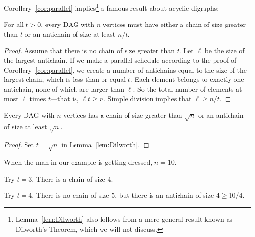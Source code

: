 Corollary~\ref{cor:parallel} implies\footnote{Lemma~\ref{lem:Dilworth}
  also follows from a more general result known as Dilworth's Theorem,
  which we will not discuss.} a famous result about acyclic digraphs:

\begin{lemma}[Dilworth]\label{lem:Dilworth}
For all $t>0$, every DAG with $n$ vertices must have either a chain of
size greater than $t$ or an antichain of size at least $n / t$.
\end{lemma}

\begin{proof}
Assume that there is no chain of size greater than $t$.  Let $\ell$ be
the size of the largest antichain.  If we make a parallel schedule
according to the proof of Corollary~\ref{cor:parallel}, we create a
number of antichains equal to the size of the largest chain, which is
less than or equal $t$.  Each element belongs to exactly one
antichain, none of which are larger than $\ell$.  So the total number
of elements at most $\ell$ times $t$---that is, $\ell t \geq n$.
Simple division implies that $\ell \geq n/t$.
\end{proof}

\begin{corollary}\label{cor:Dilworth}
Every DAG with $n$ vertices has a chain of size greater
than $\sqrt{n}$ or an antichain of size at least $\sqrt{n}$.

\begin{proof}
  Set $t = \sqrt{n}$ in Lemma~\ref{lem:Dilworth}.
\end{proof}
\end{corollary}

\begin{example}
When the man in our example is getting dressed, $n = 10$.

Try $t = 3$.  There is a chain of size $4$.

Try $t = 4$.  There is no chain of size $5$, but there is an antichain of
size $4 \geq 10 / 4$.
\end{example}

\begin{problems}
\practiceproblems
{}
{}

\classproblems
{}


\homeworkproblems
{}


\end{problems}

